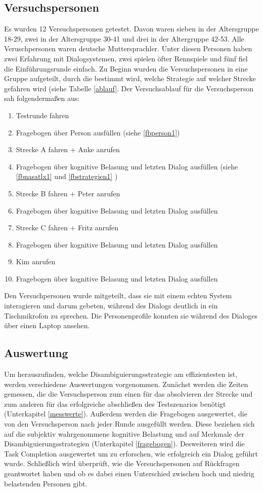 \documentclass[12pt,a4paper]{scrartcl}
\begin{document}
\subsection{Versuchspersonen}
Es wurden 12 Versuchspersonen getestet. Davon waren sieben in der Altersgruppe 18-29, zwei in der Altersgruppe 30-41 und drei in der Altergruppe 42-53. Alle Veruschpersonen waren deutsche Muttersprachler. Unter diesen Personen haben zwei Erfahrung mit Dialogsystemen, zwei spielen öfter Rennspiele und fünf fiel die Einführungsrunde einfach. Zu Beginn wurden die Versuchspersonen in eine Gruppe aufgeteilt, durch die bestimmt wird, welche Strategie auf welcher Strecke gefahren wird (siehe Tabelle \ref{ablauf}.
Der Versuchsablauf für die Versuchsperson sah folgendermaßen aus:
\begin{enumerate}
\item Testrunde fahren
\item Fragebogen über Person ausfüllen (siehe \ref{fbperson1})
\item Strecke A fahren + Anke anrufen
\item Fragebogen über kognitive Belasung und letzten Dialog ausfüllen (siehe \ref{fbnasatlx1} und \ref{fbstrategien1} )
\item Strecke B fahren + Peter anrufen
\item Fragebogen über kognitive Belasung und letzten Dialog ausfüllen
\item Strecke C fahren + Fritz anrufen
\item Fragebogen über kognitive Belasung und letzten Dialog ausfüllen 
\item Kim anrufen
\item Fragebogen über kognitive Belasung und letzten Dialog ausfüllen 
\end{enumerate}

Den Versuchpersonen wurde mitgeteilt, dass sie mit einem echten System interagieren und darum gebeten, während des Dialogs deutlich in ein Tischmikrofon zu sprechen. Die Personenprofile konnten sie während des Dialoges über einen Laptop ansehen.

\subsection{Auswertung}
\label{auswertung1}
Um herauszufinden, welche Disambiguierungsstrategie am effizientesten ist, werden verschiedene Auswertungen vorgenommen. 
Zunächst werden die Zeiten gemessen, die die Versuchsperson zum einen für das absolvieren der Strecke und zum anderen für das erfolgreiche abschließen des Testszenarios benötigt (Unterkapitel \ref{messwerte}).
Außerdem werden die Fragebogen ausgewertet, die von den Versuchsperson nach jeder Runde ausgefüllt werden. Diese beziehen sich auf die subjektiv wahrgenommene kognitive Belastung und auf Merkmale der Disambiguierungsstrategien (Unterkapitel \ref{fragebogen}). Desweiteren wird die Task Completion ausgewertet um zu erforschen, wie erfolgreich ein Dialog geführt wurde. Schließlich wird überprüft, wie die Versuchspersonen auf Rückfragen geantwortet haben und ob es dabei einen Unterschied zwischen hoch und niedrig belastenden Personen gibt. 
\end{document}
